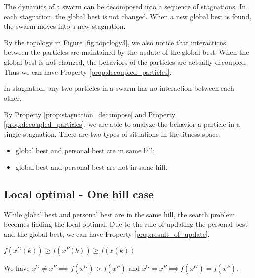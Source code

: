 \begin{property}
\label{prop:stagnation_decompose}
The dynamics of a swarm can be decomposed into a sequence of stagnations.
In each stagnation, the global best is not changed.
When a new global best is found, the swarm moves into a new stagnation.
\end{property}

By the topology in Figure \ref{fig:topology3}, we also notice that interactions between the particles are maintained by the update of the global best.
When the global best is not changed, the behaviors of the particles are actually decoupled.
Thus we can have Property \ref{prop:decoupled_particles}.

\begin{property}
\label{prop:decoupled_particles}
In stagnation, any two particles in a swarm has no interaction between each other.
\end{property}

By Property \ref{prop:stagnation_decompose} and Property \ref{prop:decoupled_particles}, we are able to analyze the behavior a particle in a single stagnation.
There are two types of situations in the fitness space:
\begin{itemize}
\item global best and personal best are in same hill;
\item global best and personal best are not in same hill.
\end{itemize}

\subsection{Local optimal - One hill case}

While global best and personal best are in the same hill, the search problem becomes finding the local optimal.
Due to the rule of updating the personal best and the global best, we can have Property \ref{prop:result_of_update}.

\begin{property}
\label{prop:result_of_update}
$ f(x^{G}(k)) \geq f(x^{P}(k)) \geq f(x(k)) $
\end{property}

We have $ x^{G} \neq x^{P} \implies f(x^{G}) > f(x^{P}) $ and $ x^{G} = x^{P} \implies f(x^{G}) = f(x^{P}) $.

